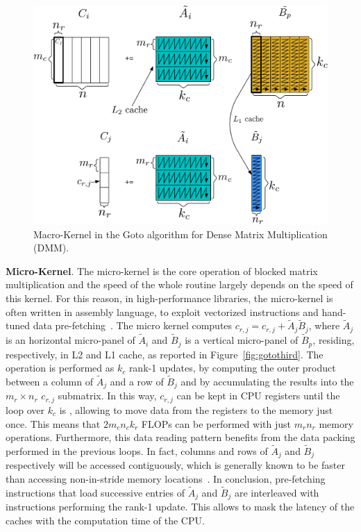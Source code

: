 \begin{figure}
	\centering
	\includegraphics[width=0.95\columnwidth ]{imgs/Goto_second.pdf}
		\caption{Macro-Kernel in the Goto algorithm for Dense Matrix Multiplication (DMM).}
		\label{fig:gotosecond}
\end{figure}



\noindent \textbf{Micro-Kernel}. The micro-kernel is the core operation of blocked matrix multiplication and the speed of the whole routine largely depends on the speed of this kernel. For this reason, in high-performance libraries, the micro-kernel is often written in assembly language, to exploit vectorized instructions and hand-tuned data pre-fetching~\cite{van2015blis}.
The micro kernel computes $c_{r,j} = c_{r,j} + \tilde{A}_j \tilde{B}_j$, where $\tilde{A}_j$ is an horizontal micro-panel of $\tilde{A}_i$ and $\tilde{B}_j$ is a vertical micro-panel of $\tilde{B}_p$, residing, respectively, in L2 and L1 cache, as reported in Figure~\ref{fig:gotothird}. The operation is performed as $k_c$ rank-1 updates, by computing the outer product between a column of  $\tilde{A}_j$ and a row of $\tilde{B}_j$ and by accumulating the results into the $m_r \times n_r$ $c_{r,j}$ submatrix. In this way, $c_{r,j}$ can be kept in CPU registers until the loop over $k_c$ is , allowing to move data from the registers to the memory just once. This means that $2m_c n_c k_r$ FLOPs can be performed with just $m_r n_r$ memory operations. Furthermore, this data reading pattern benefits from the data packing performed in the previous loops. In fact, columns and rows of $\tilde{A}_j$ and $\tilde{B}_j$ respectively will be accessed contiguously, which is generally known to be faster than accessing non-in-stride memory locations~\cite{low2016analytical}. In conclusion, pre-fetching instructions that load successive entries of $\tilde{A}_j$ and $\tilde{B}_j$ are interleaved with instructions performing the rank-1 update. This allows to mask the latency of the caches with the computation time of the CPU.


